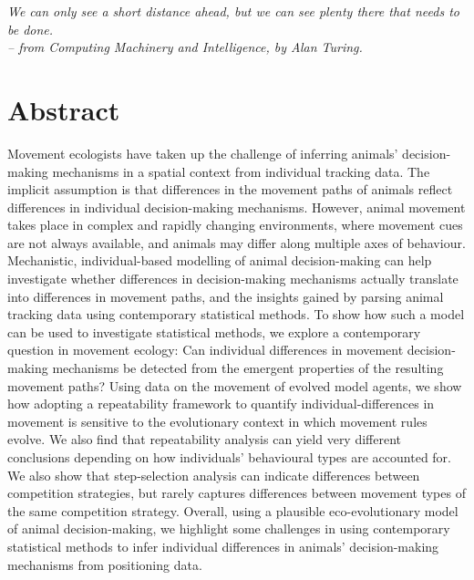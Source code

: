 

\begin{center}
    \emph{We can only see a short distance ahead, but we can see plenty there that needs to be done.\\
    \medskip
    -- \small{from Computing Machinery and Intelligence, by Alan Turing.}}
\end{center}

\section*{Abstract}

    Movement ecologists have taken up the challenge of inferring animals' decision-making mechanisms in a spatial context from individual tracking data.
    The implicit assumption is that differences in the movement paths of animals reflect differences in individual decision-making mechanisms.
    However, animal movement takes place in complex and rapidly changing environments, where movement cues are not always available, and animals may differ along multiple axes of behaviour.
    Mechanistic, individual-based modelling of animal decision-making can help investigate whether differences in decision-making mechanisms actually translate into differences in movement paths, and the insights gained by parsing animal tracking data using contemporary statistical methods.
    To show how such a model can be used to investigate statistical methods, we explore a contemporary question in movement ecology: Can individual differences in movement decision-making mechanisms be detected from the emergent properties of the resulting movement paths?
    Using data on the movement of evolved model agents, we show how adopting a repeatability framework to quantify individual-differences in movement is sensitive to the evolutionary context in which movement rules evolve.
    We also find that repeatability analysis can yield very different conclusions depending on how individuals' behavioural types are accounted for.
    We also show that step-selection analysis can indicate differences between competition strategies, but rarely captures differences between movement types of the same competition strategy.
    Overall, using a plausible eco-evolutionary model of animal decision-making, we highlight some challenges in using contemporary statistical methods to infer individual differences in animals' decision-making mechanisms from positioning data.

